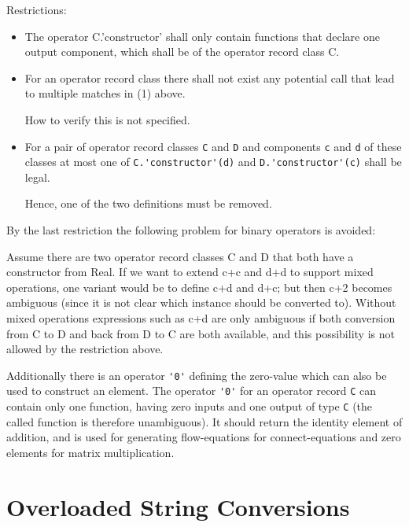 Restrictions:
\begin{itemize}
\item
  The operator C.'constructor' shall only contain functions that declare
  one output component, which shall be of the operator record class C.
\item
  For an operator record class there shall not exist any potential call
  that lead to multiple matches in (1) above.
  \begin{nonnormative}
  How to verify this is not specified.
  \end{nonnormative}
\item
  For a pair of operator record classes \lstinline!C! and \lstinline!D! and components \lstinline!c! and \lstinline!d!
  of these classes at most one of \lstinline!C.'constructor'(d)! and \lstinline!D.'constructor'(c)!
  shall be legal.
  \begin{nonnormative}
   Hence, one of the two definitions must be removed.
  \end{nonnormative}
\end{itemize}

\begin{nonnormative}
By the last restriction the following problem for binary
operators is avoided:

Assume there are two operator record classes C and D that both
have a constructor from Real. If we want to extend c+c and d+d to
support mixed operations, one variant would be to define c+d and d+c;
but then c+2 becomes ambiguous (since it is not clear which instance
should be converted to). Without mixed operations expressions such as
c+d are only ambiguous if both conversion from C to D and back from D to
C are both available, and this possibility is not allowed by the
restriction above.
\end{nonnormative}

Additionally there is an operator \lstinline!'0'! defining the zero-value which can also be used to construct an element.  The operator \lstinline!'0'! for an operator record \lstinline!C! can
contain only one function, having zero inputs and one output of type \lstinline!C! (the called function is therefore unambiguous).  It should return the identity element of addition, and is used for
generating flow-equations for connect-equations and zero elements for matrix multiplication.

\section{Overloaded String Conversions}\label{overloaded-string-conversions}

